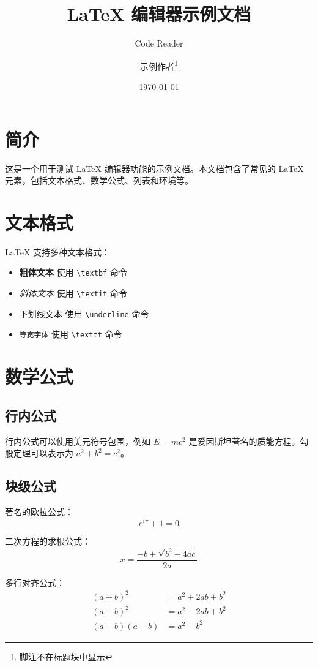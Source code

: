 \documentclass{article}
\title{LaTeX 编辑器示例文档}
\author{Code Reader \and 示例作者\thanks{脚注不在标题块中显示}}
\date{\today}
\begin{document}
\maketitle

\section{简介}

这是一个用于测试 LaTeX 编辑器功能的示例文档。本文档包含了常见的 LaTeX 元素，包括文本格式、数学公式、列表和环境等。

\section{文本格式}

LaTeX 支持多种文本格式：

\begin{itemize}
    \item \textbf{粗体文本} 使用 \texttt{\textbackslash textbf} 命令
    \item \textit{斜体文本} 使用 \texttt{\textbackslash textit} 命令
    \item \underline{下划线文本} 使用 \texttt{\textbackslash underline} 命令
    \item \texttt{等宽字体} 使用 \texttt{\textbackslash texttt} 命令
\end{itemize}

\section{数学公式}

\subsection{行内公式}

行内公式可以使用美元符号包围，例如 $E = mc^2$ 是爱因斯坦著名的质能方程。勾股定理可以表示为 $a^2 + b^2 = c^2$。

\subsection{块级公式}

著名的欧拉公式：
$$e^{i\pi} + 1 = 0$$

二次方程的求根公式：
\begin{equation}
x = \frac{-b \pm \sqrt{b^2 - 4ac}}{2a}
\end{equation}

多行对齐公式：
\begin{align}
(a + b)^2 &= a^2 + 2ab + b^2 \\
(a - b)^2 &= a^2 - 2ab + b^2 \\
(a + b)(a - b) &= a^2 - b^2
\end{align}
\end{document}
